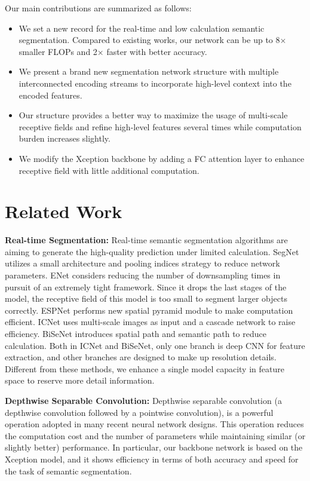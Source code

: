 \documentclass[10pt,twocolumn,letterpaper]{article}
\begin{document}
Our main contributions are summarized as follows:
\begin{itemize}

\item We set a new record for the real-time and low calculation semantic segmentation. Compared to existing works, our network can be up to 8$\times$ smaller FLOPs and 2$\times$ faster with better accuracy.
\item We present a brand new segmentation network structure with multiple interconnected encoding streams to incorporate high-level context into the encoded features.
\item Our structure provides a better way to maximize the usage of multi-scale receptive fields and refine high-level features several times while computation burden increases slightly. 
\item We modify the Xception backbone by adding a FC attention layer to enhance receptive field with little additional computation.

\end{itemize}

\cvprfinalcopy
\section{Related Work}

\textbf{Real-time Segmentation:} 
Real-time semantic segmentation algorithms are aiming to generate the high-quality prediction under limited calculation. SegNet\cite{segnet} utilizes a small architecture and pooling indices strategy to reduce network parameters. ENet\cite{enet} considers reducing the number of downsampling times in pursuit of an extremely tight framework. Since it drops the last stages of the model, the receptive field of this model is too small to segment larger objects correctly. ESPNet\cite{espnet} performs new spatial pyramid module to make computation efficient. ICNet\cite{ICNet} uses multi-scale images as input and a cascade network to raise efficiency. BiSeNet\cite{BiSeNet} introduces spatial path and semantic path to reduce calculation. Both in ICNet and BiSeNet, only one branch is deep CNN for feature extraction, and other branches are designed to make up resolution details. Different from these methods, we enhance a single model capacity in feature space to reserve more detail information. 

\textbf{Depthwise Separable Convolution:}
Depthwise separable convolution (a depthwise convolution followed by a pointwise convolution), is a powerful operation adopted in many recent neural network designs. This operation reduces the computation cost and the number of parameters while maintaining similar (or slightly better) performance. In particular, our backbone network is based on the Xception model\cite{Xception}, and it shows efficiency in terms of both accuracy and speed for the task of semantic segmentation.
\end{document}
